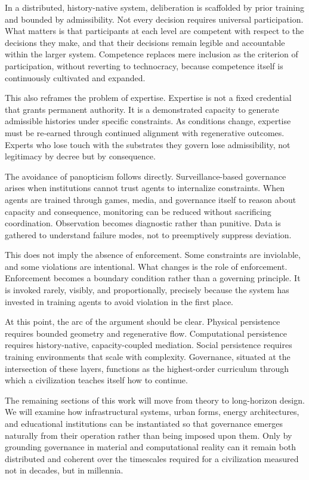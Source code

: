 \documentclass[12pt,oneside]{book}
\begin{document}
In a distributed, history-native system, deliberation is scaffolded by prior training and bounded by admissibility. Not every decision requires universal participation. What matters is that participants at each level are competent with respect to the decisions they make, and that their decisions remain legible and accountable within the larger system. Competence replaces mere inclusion as the criterion of participation, without reverting to technocracy, because competence itself is continuously cultivated and expanded.

This also reframes the problem of expertise. Expertise is not a fixed credential that grants permanent authority. It is a demonstrated capacity to generate admissible histories under specific constraints. As conditions change, expertise must be re-earned through continued alignment with regenerative outcomes. Experts who lose touch with the substrates they govern lose admissibility, not legitimacy by decree but by consequence.

The avoidance of panopticism follows directly. Surveillance-based governance arises when institutions cannot trust agents to internalize constraints. When agents are trained through games, media, and governance itself to reason about capacity and consequence, monitoring can be reduced without sacrificing coordination. Observation becomes diagnostic rather than punitive. Data is gathered to understand failure modes, not to preemptively suppress deviation.

This does not imply the absence of enforcement. Some constraints are inviolable, and some violations are intentional. What changes is the role of enforcement. Enforcement becomes a boundary condition rather than a governing principle. It is invoked rarely, visibly, and proportionally, precisely because the system has invested in training agents to avoid violation in the first place.

At this point, the arc of the argument should be clear. Physical persistence requires bounded geometry and regenerative flow. Computational persistence requires history-native, capacity-coupled mediation. Social persistence requires training environments that scale with complexity. Governance, situated at the intersection of these layers, functions as the highest-order curriculum through which a civilization teaches itself how to continue.

The remaining sections of this work will move from theory to long-horizon design. We will examine how infrastructural systems, urban forms, energy architectures, and educational institutions can be instantiated so that governance emerges naturally from their operation rather than being imposed upon them. Only by grounding governance in material and computational reality can it remain both distributed and coherent over the timescales required for a civilization measured not in decades, but in millennia.
\end{document}
